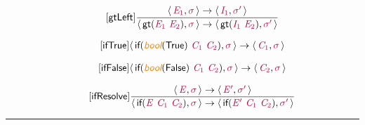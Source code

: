 \documentclass[10pt,leqno,fleqn]{article}
\newcommand{\artVariable}[1]{\mbox{\color{purple}\em #1\/}}
\newcommand{\artConstructor}[1]{\mbox{\sf #1}}
\newcommand{\artSpecial}[1]{\mbox{\color{orange}\sf\em #1}}
\begin{document}
\begin{equation}
\tag*{[\artConstructor{\sf gtLeft}]}
\begin{split}\frac{\langle\, \artVariable{E$_{1}$}, \artVariable{$\sigma$}\,\rangle \rightarrow \langle\, \artVariable{I$_{1}$}, \artVariable{$\sigma$\/$^\prime$}\,\rangle }{\langle\, \artConstructor{\sf gt}(\artVariable{E$_{1}$}\ \artVariable{E$_{2}$}), \artVariable{$\sigma$}\,\rangle \rightarrow \langle\, \artConstructor{\sf gt}(\artVariable{I$_{1}$}\ \artVariable{E$_{2}$}), \artVariable{$\sigma$\/$^\prime$}\,\rangle }
\end{split}
\end{equation}

\begin{equation}
\tag*{[\artConstructor{\sf ifTrue}]}
\begin{split}\langle\, \artConstructor{\sf if}(\artSpecial{bool}(\artConstructor{\sf True})\ \artVariable{C$_{1}$}\ \artVariable{C$_{2}$}), \artVariable{$\sigma$}\,\rangle \rightarrow \langle\, \artVariable{C$_{1}$}, \artVariable{$\sigma$}\,\rangle 
\end{split}
\end{equation}

\begin{equation}
\tag*{[\artConstructor{\sf ifFalse}]}
\begin{split}\langle\, \artConstructor{\sf if}(\artSpecial{bool}(\artConstructor{\sf False})\ \artVariable{C$_{1}$}\ \artVariable{C$_{2}$}), \artVariable{$\sigma$}\,\rangle \rightarrow \langle\, \artVariable{C$_{2}$}, \artVariable{$\sigma$}\,\rangle 
\end{split}
\end{equation}

\begin{equation}
\tag*{[\artConstructor{\sf ifResolve}]}
\begin{split}\frac{\langle\, \artVariable{E}, \artVariable{$\sigma$}\,\rangle \rightarrow \langle\, \artVariable{E\/$^\prime$}, \artVariable{$\sigma$\/$^\prime$}\,\rangle }{\langle\, \artConstructor{\sf if}(\artVariable{E}\ \artVariable{C$_{1}$}\ \artVariable{C$_{2}$}), \artVariable{$\sigma$}\,\rangle \rightarrow \langle\, \artConstructor{\sf if}(\artVariable{E\/$^\prime$}\ \artVariable{C$_{1}$}\ \artVariable{C$_{2}$}), \artVariable{$\sigma$\/$^\prime$}\,\rangle }
\end{split}
\end{equation}

\hrule
\end{document}
